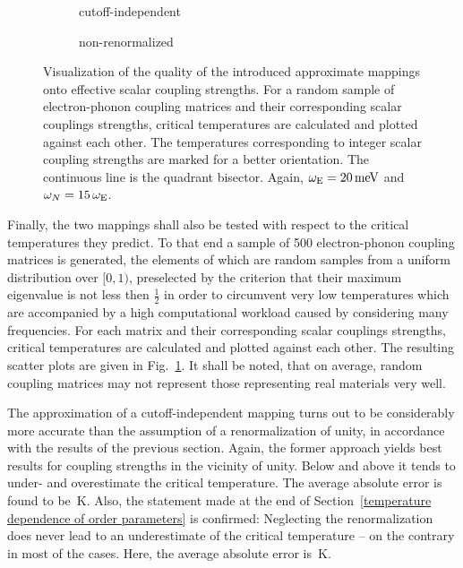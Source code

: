 \begin{figure}
    \small
    \begin{subfigure}{7cm}
        
        \caption{cutoff-independent}
    \end{subfigure}%
    \begin{subfigure}{7cm}
        
        \caption{non-renormalized}
    \end{subfigure}%
    \caption[Effective scalar coupling strengths]{
        Visualization of the quality of the introduced approximate mappings onto
        effective scalar coupling strengths. For a random sample of
        electron-phonon coupling matrices and their corresponding scalar
        couplings strengths, critical temperatures are calculated and plotted
        against each other. The temperatures corresponding to integer scalar
        coupling strengths are marked for a better orientation. The continuous
        line is the quadrant bisector. Again, $\omega \sb{\text{E}} = 20 \, \mathrm{meV}$
        and $\omega_N = 15 \, \omega \sb{\text{E}}$.}
    \label{quality of the effective scalar coupling strengths}
\end{figure}
%
Finally, the two mappings shall also be tested with respect to the critical
temperatures they predict. To that end a sample of 500 electron-phonon coupling
matrices is generated, the elements of which are random samples from a uniform
distribution over $[0, 1)$, preselected by the criterion that their maximum
eigenvalue is not less then $\frac 1 2$ in order to circumvent very low
temperatures which are accompanied by a high computational workload caused by
considering many  frequencies. For each matrix and their
corresponding scalar couplings strengths, critical temperatures are calculated
and plotted against each other. The resulting scatter plots are given in
Fig.~\ref{quality of the effective scalar coupling strengths}. It shall be
noted, that on average, random coupling matrices may not represent those
representing real materials very well.

The approximation of a cutoff-independent mapping turns out to be considerably
more accurate than the assumption of a renormalization of unity, in accordance
with the results of the previous section. Again, the former approach yields best
results for coupling strengths in the vicinity of unity. Below and above it
tends to under- and overestimate the critical temperature. The average absolute
error is found to be \,K. Also, the statement made
at the end of Section~\ref{temperature dependence of order parameters} is
confirmed: Neglecting the renormalization does never lead to an underestimate of
the critical temperature -- on the contrary in most of the cases. Here, the
average absolute error is \,K.
